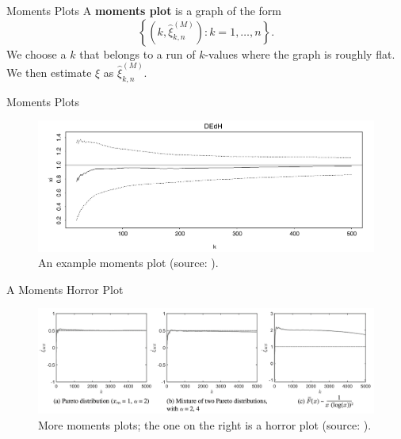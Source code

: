 \documentclass{beamer}
\begin{document}
\begin{frame}{Moments Plots}
    A \textbf{moments plot} is a graph of the form
    \[
    \left\{\left(k, \hat{\xi}_{k, n}^{(M)}\right) : k = 1, \ldots, n\right\}.
    \]
    We choose a $k$ that belongs to a run of $k$-values where the graph is roughly flat. We then estimate $\xi$ as $\hat{\xi}_{k, n}^{(M)}$.
\end{frame}

\begin{frame}{Moments Plots}
    \begin{figure}
        \centering
        \includegraphics[scale=0.35]{moments_plot.png}
        \caption{An example moments plot (source: \cite{embrechts_et_al_1997}).}
        \label{fig:moments_plot}
    \end{figure}
\end{frame}

\begin{frame}{A Moments Horror Plot}
    \begin{figure}
        \centering
        \includegraphics[scale=0.35]{moments_horror_plots.png}
        \caption{More moments plots; the one on the right is a horror plot (source: \cite{nair_et_al_2022}).}
        \label{fig:moments_horror_plots}
    \end{figure}
\end{frame}
\end{document}
